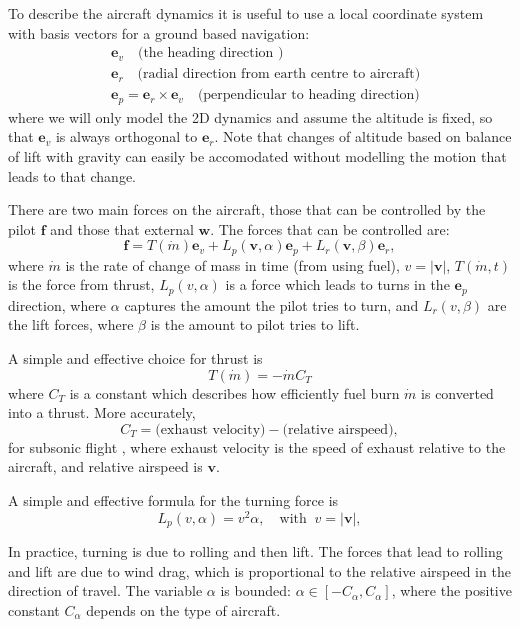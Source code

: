 \documentclass{article}
\renewcommand{\vec}[1]{\boldsymbol{#1}}
\begin{document}
To describe the aircraft dynamics it is useful to use a local coordinate system with basis vectors for a ground based navigation:
\begin{align}
    & \vec e_{v} \quad \text{(the heading direction )}
    \\
    & \vec e_r \quad \text{(radial direction from earth centre to aircraft)}
    \\
    & \vec e_p = \vec e_r \times \vec e_{v}  \quad \text{(perpendicular to heading direction)}
\end{align}
where we will only model the 2D dynamics and assume the altitude is fixed, so that $\vec e_{v}$ is always orthogonal to $\vec e_r$. Note that changes of altitude based on balance of lift with gravity can easily be accomodated without modelling the motion that leads to that change. 

There are two main forces on the aircraft, those that can be controlled by the pilot $\vec f$ and those that external $\vec w$. The forces that can be controlled are: 
\begin{equation}
    \vec{f} =  T(\dot{m}) \vec{e}_{v} + {L_p}(\vec v, \alpha) \vec{e}_p  + {L_r}(\vec v,\beta) \vec{e}_r,
\end{equation}
where $\dot m$ is the rate of change of mass in time (from using fuel), $v = |\vec v|$, $T(\dot{m},t)$ is the force from thrust, ${L_p}(v, \alpha)$ is a force which leads to turns in the $\vec e_p$ direction, where $\alpha$ captures the amount the pilot tries to turn, and $L_r(v,\beta)$ are the lift forces, where $\beta$ is the amount to pilot tries to lift. 

A simple and effective choice for thrust is
\begin{equation}
    T(\dot{m}) = - \dot m C_{T} 
\end{equation}
where $C_T$ is a constant which describes how efficiently fuel burn $\dot m$ is converted into a thrust. More accurately, 
\[
C_T = \text{(exhaust velocity)} - \text{(relative airspeed)},
\] 
for subsonic flight \cite[Chapter 4]{anderson2005introduction}, where exhaust velocity is the speed of exhaust relative to the aircraft, and relative airspeed is $\vec v$.

A simple and effective formula for the turning force is
\begin{equation}
    L_p (v, \alpha) = v^2 \alpha, \quad \text{with} \;\; v = |\vec v|,
\end{equation}

In practice, turning is due to rolling and then lift. The forces that lead to rolling and lift are due to wind drag, which is proportional to the relative airspeed in the direction of travel. The variable $\alpha$ is bounded: $\alpha \in [-C_\alpha, C_\alpha]$, where the positive constant $C_\alpha$ depends on the type of aircraft.
\end{document}
